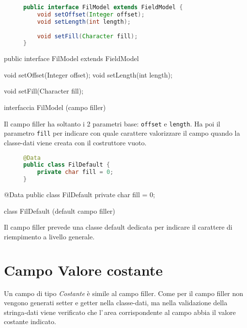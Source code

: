 \ifesource
\begin{figure*}[!htb]
\begin{lstlisting}[language=java, 
caption=interfaccia FilModel (campo filler), 
label=lst:FilModel]
public interface FilModel extends FieldModel {
    void setOffset(Integer offset);
    void setLength(int length);
    
    void setFill(Character fill);
}
\end{lstlisting}
\end{figure*}
\else
\begin{elisting}[!htb]
\begin{javacode}
public interface FilModel extends FieldModel {
    void setOffset(Integer offset);
    void setLength(int length);
    
    void setFill(Character fill);
}
\end{javacode}
\caption{interfaccia FilModel (campo filler)}
\label{lst:FilModel}
\end{elisting}
\fi

Il campo filler ha soltanto i 2 parametri base: \verb!offset! e \verb!length!.
Ha poi il parametro \verb!fill! per indicare con quale carattere valorizzare il
campo quando la classe-dati viene creata con il costruttore vuoto.

\ifesource
\begin{figure*}[!htb]
\begin{lstlisting}[language=java, 
caption=class FilDefault (default campo filler), 
label=lst:FilDefault]
@Data
public class FilDefault {
    private char fill = 0;
}
\end{lstlisting}
\end{figure*}
\else
\begin{elisting}[!htb]
\begin{javacode}
@Data
public class FilDefault {
    private char fill = 0;
}
\end{javacode}
\caption{class FilDefault (default campo filler)}
\label{lst:FilDefault}
\end{elisting}
\fi

Il campo filler prevede una classe default dedicata per indicare il carattere di
riempimento a livello generale.

\section{Campo Valore costante}
Un campo di tipo \textsl{Costante} è simile al campo filler. Come per il campo
filler non vengono generati setter e getter nella classe-dati, ma nella 
validazione della stringa-dati viene verificato che l'\,area corrispondente al 
campo abbia il valore costante indicato.

